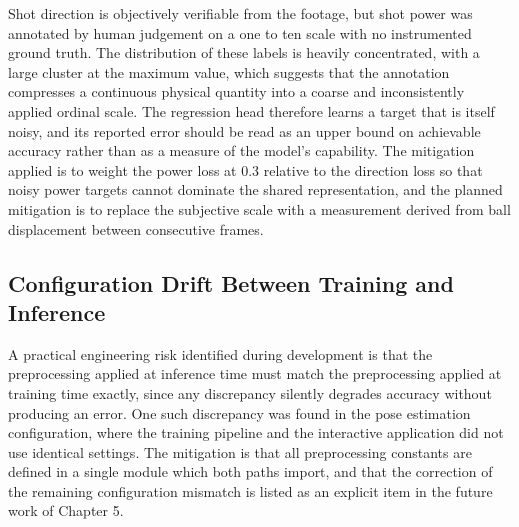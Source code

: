 Shot direction is objectively verifiable from the footage, but shot power was annotated by human judgement on a one to ten scale with no instrumented ground truth. The distribution of these labels is heavily concentrated, with a large cluster at the maximum value, which suggests that the annotation compresses a continuous physical quantity into a coarse and inconsistently applied ordinal scale. The regression head therefore learns a target that is itself noisy, and its reported error should be read as an upper bound on achievable accuracy rather than as a measure of the model's capability. The mitigation applied is to weight the power loss at 0.3 relative to the direction loss so that noisy power targets cannot dominate the shared representation, and the planned mitigation is to replace the subjective scale with a measurement derived from ball displacement between consecutive frames.

\subsection{Configuration Drift Between Training and Inference}

A practical engineering risk identified during development is that the preprocessing applied at inference time must match the preprocessing applied at training time exactly, since any discrepancy silently degrades accuracy without producing an error. One such discrepancy was found in the pose estimation configuration, where the training pipeline and the interactive application did not use identical settings. The mitigation is that all preprocessing constants are defined in a single module which both paths import, and that the correction of the remaining configuration mismatch is listed as an explicit item in the future work of Chapter 5.

\clearpage
